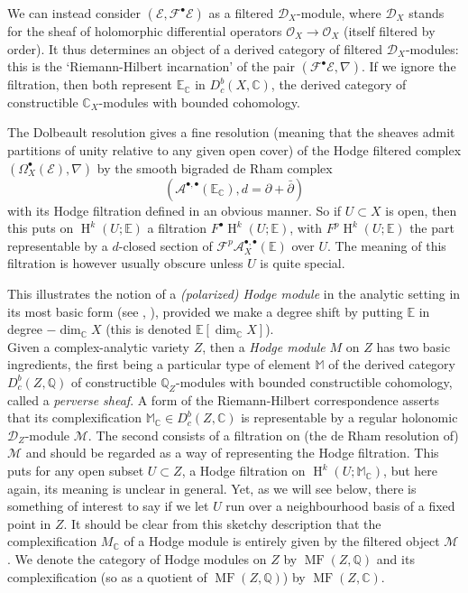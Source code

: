 \documentclass[12pt,letterpaper]{amsart}
\numberwithin{equation}{section}
\def\CC{{\mathbb C}}
\def\EE{{\mathbb E}}
\def\MM{{\mathbb M}}
\def\QQ{{\mathbb Q}}
\newcommand{\p}{\partial}
\def\Ascr{{\mathscr A}}
\def\Ecal{{\mathcal E}}
\def\Fcal{{\mathcal F}}
\def\Mcal{{\mathcal M}}
\def\Ocal{{\mathcal O}}
\def\Dscr{{\mathscr D}}
\def\pt{{\scriptscriptstyle\bullet}}
\newcommand\Hl{\operatorname{H}}
\newcommand\MF{\operatorname{MF}}
\theoremstyle{remark}
\begin{document}
We can instead consider  $(\Ecal, \Fcal^\pt\Ecal)$ as a filtered $\Dscr_X$-module,  
where $\Dscr_X$ stands for the sheaf of holomorphic differential operators $\Ocal_X\to \Ocal_X$ (itself  filtered by order). 
It thus determines an object of a derived category of filtered $\Dscr_X$-modules: this  is the  
`Riemann-Hilbert incarnation' of  the pair $(\Fcal^\pt\Ecal, \nabla)$. 
If we ignore the filtration, then both represent $\EE_\CC$ in  $D_c^b(X,\CC)$, 
the derived category of constructible $\CC_X$-modules  with bounded cohomology. 

The  Dolbeault resolution gives  a fine resolution (meaning that the sheaves  admit partitions of unity relative to any given open cover) of the  Hodge filtered     complex  $(\Omega^\pt_X(\Ecal), \nabla)$ by the smooth bigraded de Rham complex  
\[
(\Ascr^{\pt,\pt}(\EE_\CC), d=\p +\bar\p)
\]
  with its Hodge filtration defined in an obvious manner. 
So if $U\subset X$ is open, then this puts on $\Hl^k(U; \EE)$ a filtration $F^\pt\Hl^k(U; \EE)$, with $F^p\Hl^k(U; \EE)$
the part representable by a $d$-closed section of $\Fcal^p\Ascr_X^{\pt, \pt}(\EE)$ over $U$. 
The meaning of this filtration is however usually obscure unless  $U$ is quite special.

This illustrates  the notion of a \emph{(polarized) Hodge module} in the analytic setting  in its most basic  form 
(see \cite{saito:hmodules}, \cite{saito:guide}), provided we make a degree  shift by putting $\EE$ in degree  
$-\dim_\CC X$ (this is denoted $\EE[\dim_\CC X]$). \\

Given 
a complex-analytic variety  $Z$, then a \emph{Hodge module} $M$ on $Z$ has two basic  ingredients, the first
being  a particular 
type of element $\MM$ of the derived category $D_c^b(Z,\QQ)$ of constructible $\QQ_Z$-modules with bounded constructible cohomology,  called a \emph{perverse sheaf}.  A form of the 
Riemann-Hilbert correspondence asserts that its complexification  $\MM_\CC\in D_c^b(Z,\CC)$ is representable 
by a regular holonomic  $\Dscr_Z$-module $\Mcal$. The  second consists of a filtration  on (the de Rham  resolution of) $\Mcal$ and should be regarded as a way of representing the 
Hodge filtration. This puts for any open subset $U\subset Z$, a Hodge filtration on $\Hl^k(U;\MM_\CC)$,  
but here again, its meaning is unclear in general.  Yet, as we will see below,  there is something of interest to say  
if we let $U$ run over a  neighbourhood basis  of a fixed point in $Z$. It should be clear from this sketchy  description that  the complexification $M_\CC$ of a Hodge module is entirely given by the filtered object $\Mcal$. 
We denote the category  of Hodge modules on $Z$ by  $\MF (Z,\QQ)$ and its complexification  (so as a quotient of $\MF (Z,\QQ)$) by  $\MF (Z,\CC)$. 
\end{document}
